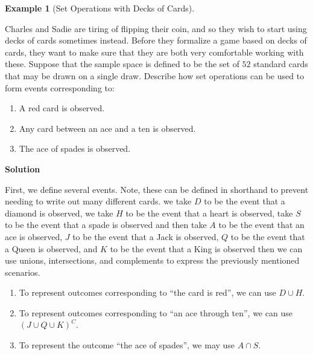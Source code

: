 \documentclass[
  letterpaper,
  DIV=11,
  numbers=noendperiod]{scrreprt}
\providecommand{\tightlist}{%
  \setlength{\itemsep}{0pt}\setlength{\parskip}{0pt}}\usepackage{longtable,booktabs,array}
\theoremstyle{definition}
\theoremstyle{definition}
\theoremstyle{definition}
\newtheorem{example}{Example}[chapter]
\theoremstyle{remark}
\begin{document}
\begin{example}[Set Operations with Decks of
Cards]\protect\hypertarget{exm-card-set-operations}{}\label{exm-card-set-operations}

Charles and Sadie are tiring of flipping their coin, and so they wish to
start using decks of cards sometimes instead. Before they formalize a
game based on decks of cards, they want to make sure that they are both
very comfortable working with these. Suppose that the sample space is
defined to be the set of \(52\) standard cards that may be drawn on a
single draw. Describe how set operations can be used to form events
corresponding to:

\begin{enumerate}
\def\labelenumi{\alph{enumi}.}
\tightlist
\item
  A red card is observed.
\item
  Any card between an ace and a ten is observed.
\item
  The ace of spades is observed.
\end{enumerate}

\begin{tcolorbox}[enhanced jigsaw, colback=white, breakable, rightrule=.15mm, leftrule=.75mm, toprule=.15mm, left=2mm, arc=.35mm, opacityback=0, bottomrule=.15mm]

\vspace{-3mm}\textbf{Solution}\vspace{3mm}

First, we define several events. Note, these can be defined in shorthand
to prevent needing to write out many different cards. we take \(D\) to
be the event that a diamond is observed, we take \(H\) to be the event
that a heart is observed, take \(S\) to be the event that a spade is
observed\footnotemark{} and then take \(A\) to be the event that an ace
is observed, \(J\) to be the event that a Jack is observed, \(Q\) to be
the event that a Queen is observed, and \(K\) to be the event that a
King is observed\footnotemark{} then we can use unions, intersections,
and complements to express the previously mentioned scenarios.

\begin{enumerate}
\def\labelenumi{\alph{enumi}.}
\tightlist
\item
  To represent outcomes corresponding to ``the card is red'', we can use
  \(D \cup H\).
\item
  To represent outcomes corresponding to ``an ace through ten'', we can
  use \((J \cup Q \cup K)^C\).
\item
  To represent the outcome ``the ace of spades'', we may use
  \(A \cap S\).
\end{enumerate}

\end{tcolorbox}



\end{example}
\end{document}
